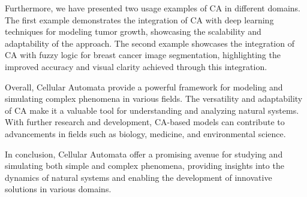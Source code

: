 \documentclass[9pt,a4paper,twoside]{tau-class/tau}
\begin{document}
Furthermore, we have presented two usage examples of CA in different domains. The first example demonstrates the integration of CA with deep learning techniques for modeling tumor growth, showcasing the scalability and adaptability of the approach. The second example showcases the integration of CA with fuzzy logic for breast cancer image segmentation, highlighting the improved accuracy and visual clarity achieved through this integration.

Overall, Cellular Automata provide a powerful framework for modeling and simulating complex phenomena in various fields. The versatility and adaptability of CA make it a valuable tool for understanding and analyzing natural systems. With further research and development, CA-based models can contribute to advancements in fields such as biology, medicine, and environmental science.

In conclusion, Cellular Automata offer a promising avenue for studying and simulating both simple and complex phenomena, providing insights into the dynamics of natural systems and enabling the development of innovative solutions in various domains.

\printbibliography
\end{document}
